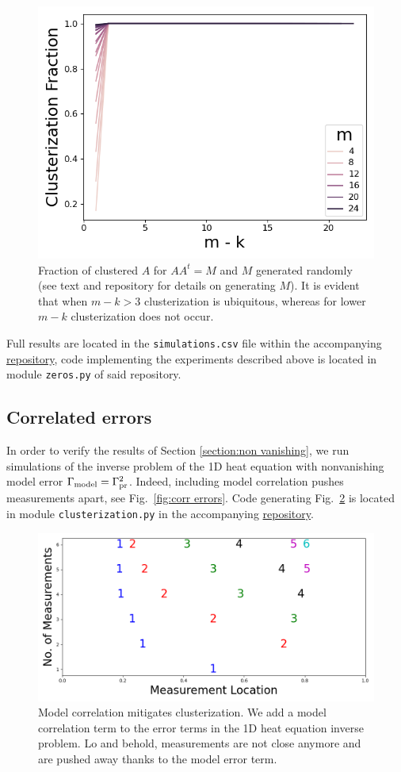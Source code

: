 \begin{figure}
    \centering
    \includegraphics[height=0.5\textwidth]{figs/simulations.png}
    \caption{Fraction of clustered $A$ for $AA^t = M$ and $M$
      generated randomly (see text and repository for details on
      generating $M$). It is evident that when $m-k >3$ clusterization
      is ubiquitous, whereas for lower $m-k$ clusterization does not
      occur.}
  \label{fig:sim AAt}
\end{figure}

Full results are located in the \texttt{simulations.csv} file within
the accompanying \href{https://github.com/yairdaon/OED}{repository},
code implementing the experiments described above is located in module
\texttt{zeros.py} of said repository.


\subsection{Correlated errors}\label{subsec:corr errors sims}
In order to verify the results of Section \ref{section:non vanishing},
we run simulations of the inverse problem of the 1D heat equation with
nonvanishing model error \(\Gamma_{\textup{model}} = \Gamma_{\textup{pr}}^2 \). Indeed, including
model correlation pushes measurements apart, see Fig.~\ref{fig:corr
  errors}. Code generating Fig.~\ref{fig:corr errors} is located in
module \texttt{clusterization.py} in the accompanying
\href{https://github.com/yairdaon/OED}{repository}.

\begin{figure}
    \centering
    \includegraphics[height=0.5\textwidth]{figs/dst_modelError4.png}
    \caption{Model correlation mitigates clusterization. We add a
      model correlation term to the error terms in the 1D heat
      equation inverse problem. Lo and behold, measurements are not
      close anymore and are pushed away thanks to the model error
      term.}
  \label{fig:corr errors}
\end{figure}
